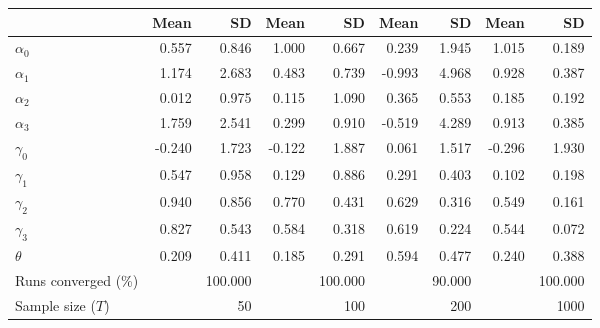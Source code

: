 
\begin{tabular}[t]{lrrrrrrrr}
\toprule
  & Mean & SD & Mean  & SD  & Mean   & SD   & Mean    & SD   \\
\midrule
$\alpha_{0}$ & 0.557 & 0.846 & 1.000 & 0.667 & 0.239 & 1.945 & 1.015 & 0.189\\
$\alpha_{1}$ & 1.174 & 2.683 & 0.483 & 0.739 & -0.993 & 4.968 & 0.928 & 0.387\\
$\alpha_{2}$ & 0.012 & 0.975 & 0.115 & 1.090 & 0.365 & 0.553 & 0.185 & 0.192\\
$\alpha_{3}$ & 1.759 & 2.541 & 0.299 & 0.910 & -0.519 & 4.289 & 0.913 & 0.385\\
$\gamma_{0}$ & -0.240 & 1.723 & -0.122 & 1.887 & 0.061 & 1.517 & -0.296 & 1.930\\
$\gamma_{1}$ & 0.547 & 0.958 & 0.129 & 0.886 & 0.291 & 0.403 & 0.102 & 0.198\\
$\gamma_{2}$ & 0.940 & 0.856 & 0.770 & 0.431 & 0.629 & 0.316 & 0.549 & 0.161\\
$\gamma_{3}$ & 0.827 & 0.543 & 0.584 & 0.318 & 0.619 & 0.224 & 0.544 & 0.072\\
$\theta$ & 0.209 & 0.411 & 0.185 & 0.291 & 0.594 & 0.477 & 0.240 & 0.388\\
Runs converged (\%) &  & 100.000 &  & 100.000 &  & 90.000 &  & 100.000\\
Sample size ($T$) &  & 50 &  & 100 &  & 200 &  & 1000\\
\bottomrule
\end{tabular}
